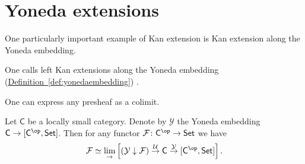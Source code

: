 \documentclass[main.tex]{subfiles}
\begin{document}
\section{Yoneda extensions}
\label{sec:yoneda_extensions}

One particularly important example of Kan extension is Kan extension along the Yoneda embedding.

\begin{definition}
  \label{def:yoneda_extension}
  One calls left Kan extensions along the Yoneda embedding (\hyperref[def:yonedaembedding]{Definition~\ref*{def:yonedaembedding}}) .
\end{definition}

One can express any presheaf as a colimit.

\begin{lemma}
  \label{lemma:colimit_of_comma_category}
  Let $\mathsf{C}$ be a locally small category. Denote by $\mathcal{Y}$ the Yoneda embedding $\mathsf{C} \to [\mathsf{C}^{\op}, \mathsf{Set}]$. Then for any functor $\mathcal{F}\colon \mathsf{C}^{\op} \to \mathsf{Set}$ we have
  \begin{equation*}
    \mathcal{F} \simeq \lim_{\rightarrow} \left[ (\mathcal{Y} \downarrow \mathcal{F}) \overset{\mathcal{U}}{\to} \mathsf{C} \overset{\mathcal{Y}}{\to} [\mathsf{C}^{\op}, \mathsf{Set}] \right].
  \end{equation*}
\end{lemma}
\end{document}

